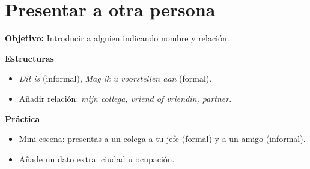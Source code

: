 \section{Presentar a otra persona}
\textbf{Objetivo:} Introducir a alguien indicando nombre y relación.

\textbf{Estructuras}
\begin{itemize}[leftmargin=*]
	\item \textit{Dit is\textellipsis{}} (informal), \textit{Mag ik u voorstellen aan\textellipsis{}} (formal).
	\item Añadir relación: \textit{mijn collega, vriend of vriendin, partner}.
\end{itemize}

\textbf{Práctica}
\begin{itemize}[leftmargin=*]
	\item Mini escena: presentas a un colega a tu jefe (formal) y a un amigo (informal).
	\item Añade un dato extra: ciudad u ocupación.
\end{itemize}
